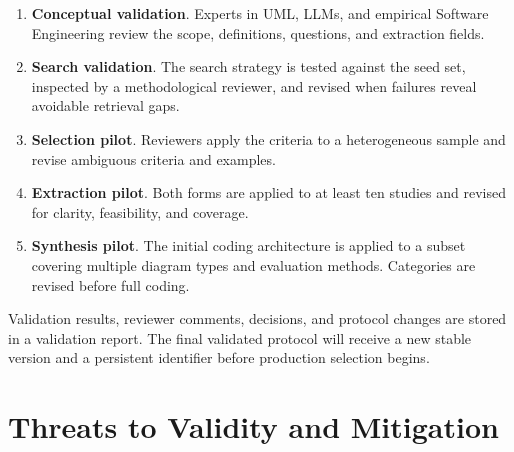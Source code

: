 \begin{enumerate}[label=\arabic*)]
    \item \textbf{Conceptual validation}. Experts in UML, LLMs, and empirical Software Engineering review the scope, definitions, questions, and extraction fields.
    \item \textbf{Search validation}. The search strategy is tested against the seed set, inspected by a methodological reviewer, and revised when failures reveal avoidable retrieval gaps.
    \item \textbf{Selection pilot}. Reviewers apply the criteria to a heterogeneous sample and revise ambiguous criteria and examples.
    \item \textbf{Extraction pilot}. Both forms are applied to at least ten studies and revised for clarity, feasibility, and coverage.
    \item \textbf{Synthesis pilot}. The initial coding architecture is applied to a subset covering multiple diagram types and evaluation methods. Categories are revised before full coding.
\end{enumerate}

Validation results, reviewer comments, decisions, and protocol changes are stored in a validation report. The final validated protocol will receive a new stable version and a persistent identifier before production selection begins.

\section{Threats to Validity and Mitigation}
\label{sec:protocol_validity}

